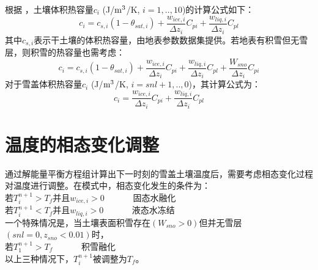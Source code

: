 根据 \citet{de1963thermal}，土壤体积热容量$c_i$ (J/$\rm m^3$/K, $i=1,..,10$)的计算公式如下：
\begin{equation}
c_{i}=c_{s, i}\left(1-\theta_{sat, i}\right)+\frac{w_{ice, i}}{\Delta z_{i}} C_{pi}+\frac{w_{liq, i}}{\Delta z_{i}} C_{p l}
\end{equation}
其中$c_{s,i}$表示干土壤的体积热容量，由地表参数数据集提供。若地表有积雪但无雪层，则积雪的热容量也需考虑：
\begin{equation}
c_{i}=c_{s,i}\left(1-\theta_{sat, i}\right)+\frac{w_{ice, i}}{\Delta z_{i}} C_{pi}+\frac{w_{liq,i}}{\Delta z_{i}} C_{pl}+\frac{W_{sno}}{\Delta z_{i}} C_{pi}
\end{equation}
对于雪盖体积热容量$c_i$ (J/$\rm m^3$/K, $i=snl+1,..,0$)，其计算公式为：
\begin{equation}
c_{i}=\frac{w_{ice, i}}{\Delta z_{i}} C_{pi}+\frac{w_{liq, i}}{\Delta z_{i}} C_{pl}
\end{equation}


\section{温度的相态变化调整}
通过解能量平衡方程组计算出下一时刻的雪盖土壤温度后，需要考虑相态变化过程对温度进行调整。在模式中，相态变化发生的条件为：\\
若$T_i^{n+1}>T_f$并且$w_{ice,i}>0$ \ \   \ \  \ \   固态水融化\\
若$T_i^{n+1}<T_f$并且$w_{liq,i}>0$  \ \   \ \  \ \         液态水冻结\\
一个特殊情况是，当土壤表面积雪存在$\left(W_{sno}>0\right)$但并无雪层$\left(snl=0,z_{sno}<0.01\right)$时，\\
若$T_1^{n+1}>T_f$      \ \   \ \  \ \                 积雪融化\\
以上三种情况下，$T_i^{n+1}$被调整为$T_f$。


